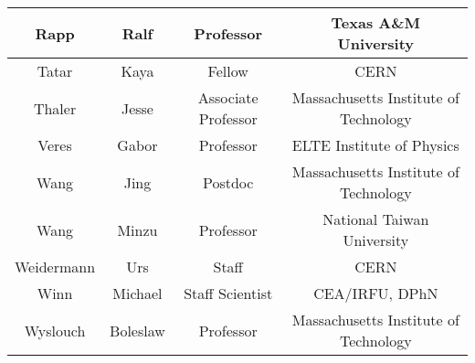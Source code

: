 \begin{table}[h]
\begin{tabular}{ | c | c | c | c | }
    Rapp & Ralf & Professor &  Texas A\&M University\\ \hline
    Tatar & Kaya & Fellow & CERN \\ \hline
    Thaler & Jesse & Associate Professor &  Massachusetts Institute of Technology\\ \hline
    Veres & Gabor & Professor & ELTE Institute of Physics\\ \hline
    Wang & Jing & Postdoc & Massachusetts Institute of Technology \\ \hline
    Wang & Minzu & Professor &  National Taiwan University\\ \hline
    Weidermann & Urs & Staff & CERN \\ \hline
    Winn & Michael & Staff Scientist & CEA/IRFU, DPhN \\ \hline
    Wyslouch & Boleslaw & Professor & Massachusetts Institute of Technology \\ \hline
  \end{tabular}
\end{table}

